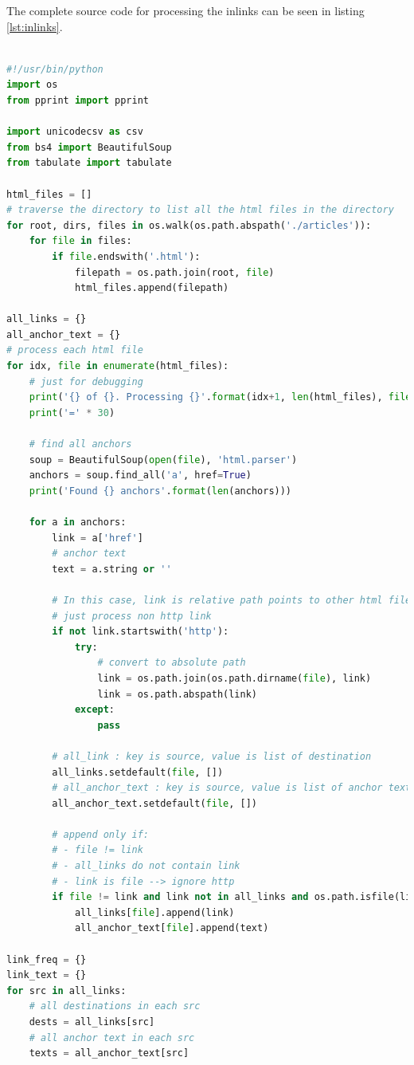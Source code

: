 \documentclass[letterpaper,11pt]{article}
\begin{document}
The complete source code for processing the inlinks can be seen in listing \ref{lst:inlinks}.

\begin{lstlisting}[language=python, caption={Source code for finding 10 Wikipedia documents with the most inlinks}, label={lst:inlinks}]

#!/usr/bin/python
import os
from pprint import pprint

import unicodecsv as csv
from bs4 import BeautifulSoup
from tabulate import tabulate

html_files = []
# traverse the directory to list all the html files in the directory
for root, dirs, files in os.walk(os.path.abspath('./articles')):
    for file in files:
        if file.endswith('.html'):
            filepath = os.path.join(root, file)
            html_files.append(filepath)

all_links = {}
all_anchor_text = {}
# process each html file
for idx, file in enumerate(html_files):
    # just for debugging
    print('{} of {}. Processing {}'.format(idx+1, len(html_files), file))
    print('=' * 30)

    # find all anchors
    soup = BeautifulSoup(open(file), 'html.parser')
    anchors = soup.find_all('a', href=True)
    print('Found {} anchors'.format(len(anchors)))

    for a in anchors:
        link = a['href']
        # anchor text
        text = a.string or ''

        # In this case, link is relative path points to other html file
        # just process non http link
        if not link.startswith('http'):
            try:
                # convert to absolute path
                link = os.path.join(os.path.dirname(file), link)
                link = os.path.abspath(link)
            except:
                pass

        # all_link : key is source, value is list of destination
        all_links.setdefault(file, [])
        # all_anchor_text : key is source, value is list of anchor text
        all_anchor_text.setdefault(file, [])

        # append only if:
        # - file != link
        # - all_links do not contain link
        # - link is file --> ignore http
        if file != link and link not in all_links and os.path.isfile(link):
            all_links[file].append(link)
            all_anchor_text[file].append(text)

link_freq = {}
link_text = {}
for src in all_links:
    # all destinations in each src
    dests = all_links[src]
    # all anchor text in each src
    texts = all_anchor_text[src]


\end{lstlisting}
\end{document}
